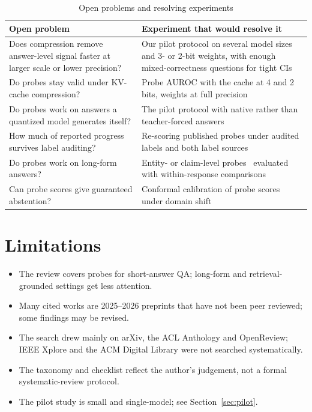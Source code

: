 \documentclass[conference]{IEEEtran}
\begin{document}
\begin{table}[!t]
\caption{Open problems and resolving experiments}
\label{tab:open}
\footnotesize
\begin{tabularx}{\columnwidth}{@{}YY@{}}
\toprule
Open problem & Experiment that would resolve it \\
\midrule
Does compression remove answer-level signal faster at larger scale or lower precision? & Our pilot protocol on several model sizes and 3- or 2-bit weights, with enough mixed-correctness questions for tight CIs \\
Do probes stay valid under KV-cache compression? & Probe AUROC with the cache at 4 and 2 bits, weights at full precision \\
Do probes work on answers a quantized model generates itself? & The pilot protocol with native rather than teacher-forced answers \\
How much of reported progress survives label auditing? & Re-scoring published probes under audited labels and both label sources \\
Do probes work on long-form answers? & Entity- or claim-level probes~\cite{obeso2025realtime} evaluated with within-response comparisons \\
Can probe scores give guaranteed abstention? & Conformal calibration of probe scores~\cite{tayebati2025cap} under domain shift \\
\bottomrule
\end{tabularx}
\end{table}

\section{Limitations}
\begin{itemize}
\item The review covers probes for short-answer QA; long-form and retrieval-grounded settings get less attention.
\item Many cited works are 2025--2026 preprints that have not been peer reviewed; some findings may be revised.
\item The search drew mainly on arXiv, the ACL Anthology and OpenReview; IEEE Xplore and the ACM Digital Library were not searched systematically.
\item The taxonomy and checklist reflect the author's judgement, not a formal systematic-review protocol.
\item The pilot study is small and single-model; see Section~\ref{sec:pilot}.
\end{itemize}
\end{document}
